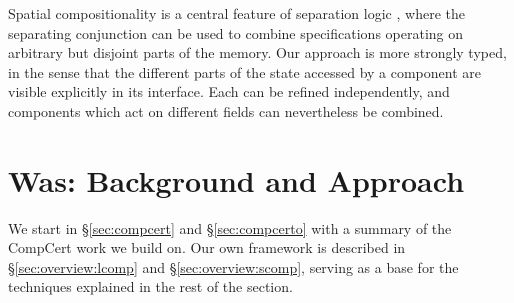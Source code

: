 \documentclass[acmsmall,screen,review,anonymous,nonacm]{acmart}
\newcommand{\kw}[1]{\ensuremath{ \mathsf{#1} }}
\begin{document}
Spatial compositionality is
a central feature of separation logic \cite{seplog},
where the separating conjunction
can be used to combine specifications
operating on arbitrary but disjoint parts of the memory.
Our approach is more strongly typed,
in the sense that the different parts of the state
accessed by a component
are visible explicitly in its interface.
Each can be refined independently,
and components which act on different fields
can nevertheless be combined.



%


\section*{Was: Background and Approach} %

We start in \S\ref{sec:compcert} and \S\ref{sec:compcerto}
with a summary of the CompCert work we build on.
Our own framework is described
in \S\ref{sec:overview:lcomp} and \S\ref{sec:overview:scomp},
serving as a base for the techniques explained in the rest of the section.
\end{document}

